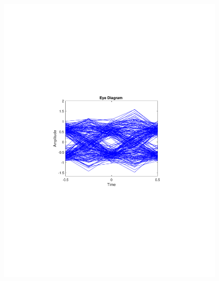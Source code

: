 \begin{refsection}
\begin{figure}[H]
\begin{minipage}{0.30\textwidth}
		\includegraphics[clip, trim=4cm 8cm 4cm 8cm, width=1\textwidth]{./sdf/m_qam_system/figures/expResults/intradyne/5_eye_16GBdInSig13dB_AfPE.pdf}
		\label{fig:16GBdSpecPE1}
	\end{minipage}
	\begin{minipage}{0.30\textwidth}
		\centering

\end{minipage}
\end{figure}
\end{refsection}
